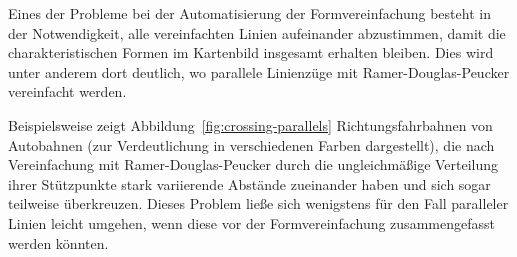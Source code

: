 \documentclass[../main/thesis.tex]{subfiles}
\begin{document}
Eines der Probleme bei der Automatisierung der Formvereinfachung besteht in der Notwendigkeit, alle vereinfachten Linien aufeinander abzustimmen, damit die charakteristischen Formen im Kartenbild insgesamt erhalten bleiben. 
Dies wird unter anderem dort deutlich, wo parallele Linienzüge mit Ramer-Douglas-Peucker vereinfacht werden.


Beispielsweise zeigt Abbildung~\ref{fig:crossing-parallels} Richtungsfahrbahnen von Autobahnen (zur Verdeutlichung in verschiedenen Farben dargestellt), die nach Vereinfachung mit Ramer-Douglas-Peucker durch die ungleichmäßige Verteilung ihrer Stützpunkte stark variierende Abstände zueinander haben und sich sogar teilweise überkreuzen.
Dieses Problem ließe sich wenigstens für den Fall paralleler Linien leicht umgehen, wenn diese vor der Formvereinfachung zusammengefasst werden könnten.
\end{document}
